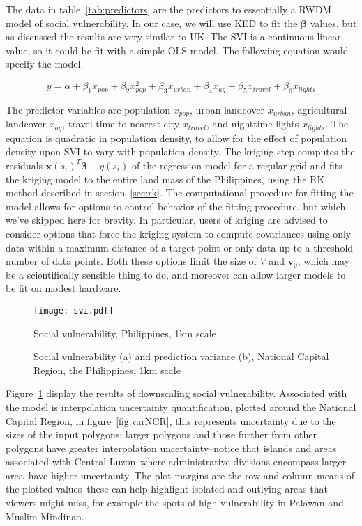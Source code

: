 The data in table~\ref{tab:predictors} are the predictors to essentially a RWDM model of social vulnerability.  In our case, we will use KED to fit the $\bm{\beta}$ values, but as discussed the results are very similar to UK.  The SVI is a continuous linear value, so it could be fit with a simple OLS model.  The following equation would specify the model.

\[y=\alpha+\beta_1x_{pop}+\beta_2x_{pop}^2+\beta_3x_{urban}+\beta_4x_{ag}+\beta_5x_{travel}+\beta_6x_{lights}\]

The predictor variables are population $x_{pop}$, urban landcover $x_{urban}$, agricultural landcover $x_{ag}$, travel time to nearest city $x_{travel}$, and nighttime lights $x_{lights}$.  The equation is quadratic in population density, to allow for the effect of population density upon SVI to vary with population density.  The kriging step computes the residuals $\bm{x}(s_i)^T \bm{\beta} - y(s_i)$ of the regression model for a regular grid and fits the kriging model to the entire land mass of the Philippines, using the RK method described in section~\ref{sec:rk}.  The computational procedure for fitting the model allows for options to control behavior of the fitting procedure, but which we've skipped here for brevity.  In particular, users of kriging are advised to consider options that force the kriging system to compute covariances using only data within a maximum distance of a target point or only data up to a threshold number of data points.  Both these options limit the size of $V$ and $\bm{v}_0$, which may be a scientifically sensible thing to do, and moreover can allow larger models to be fit on modest hardware.

\begin{figure}
  \centering
  \texttt{[image: svi.pdf]}
  \caption{Social vulnerability, Philippines, 1km scale} \label{fig:svi}
\end{figure}

\begin{figure}
  \centering
  \caption{Social vulnerability (a) and prediction variance (b), National Capital Region, the Philippines, 1km scale}
\end{figure}

Figure~\ref{fig:svi} display the results of downscaling social vulnerability.  Associated with the model is interpolation uncertainty quantification, plotted around the National Capital Region, in figure~\ref{fig:varNCR}, this represents uncertainty due to the sizes of the input polygons; larger polygons and those further from other polygons have greater interpolation uncertainty--notice that islands and areas associated with Central Luzon--where administrative divisions encompass larger area--have higher uncertainty.  The plot margins are the row and column means of the plotted values--these can help highlight isolated and outlying areas that viewers might miss, for example the spots of high vulnerability in Palawan and Muslim Mindinao.

